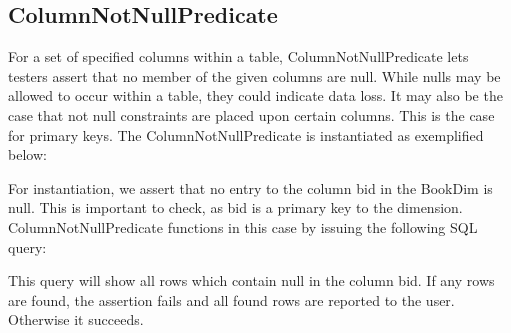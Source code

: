 \subsection{ColumnNotNullPredicate}
For a set of specified columns within a table, ColumnNotNullPredicate lets testers assert that no member of the given columns are null. While nulls may be allowed to occur within a table, they could indicate data loss. It may also be the case that not null constraints are placed upon certain columns. This is the case for primary keys. The ColumnNotNullPredicate is instantiated as exemplified below:


For instantiation, we assert that no entry to the column bid in the BookDim is null. This is important to check, as bid is a primary key to the dimension. 
ColumnNotNullPredicate functions in this case by issuing the following SQL query:


This query will show all rows which contain null in the column bid. If any rows are found, the assertion fails and all found rows are reported to the user. Otherwise it succeeds.